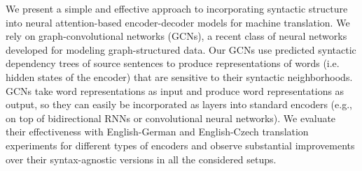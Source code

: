 We present a simple and effective approach to incorporating syntactic structure into neural attention-based encoder-decoder models for machine translation. We rely on graph-convolutional networks (GCNs), a recent class of neural networks developed for modeling graph-structured data. Our GCNs use predicted syntactic dependency trees of source sentences to produce representations of words (i.e. hidden states of the encoder) that are sensitive to their syntactic neighborhoods. GCNs take word representations as input and produce word representations as output, so they can easily be incorporated as layers into standard encoders (e.g., on top of bidirectional RNNs or convolutional neural networks). We evaluate their effectiveness with English-German and English-Czech translation experiments for different types of encoders and observe substantial improvements over their syntax-agnostic versions in all the considered setups.
